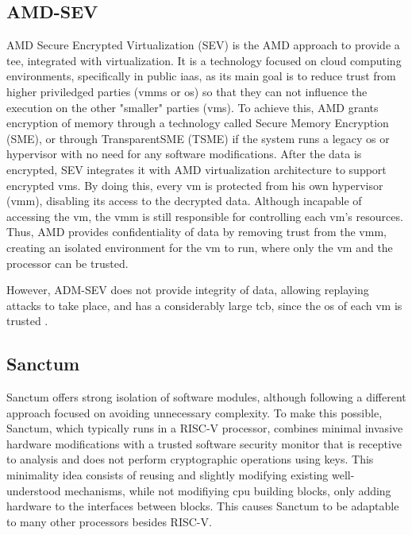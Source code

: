 \subsection{AMD-SEV}
\label{ssec:amdsev}
AMD Secure Encrypted Virtualization (SEV) \cite{amdPaper} is the AMD approach to provide a \gls{tee}, integrated with virtualization. It is a technology focused on cloud computing environments, specifically in public \gls{iaas}, as its main goal is to reduce trust from higher priviledged parties (\gls{vmm}s or \gls{os}) so that they can not influence the execution on the other "smaller" parties (\gls{vm}s). 
To achieve this, AMD grants encryption of memory through a technology called Secure Memory Encryption (SME), or through TransparentSME (TSME) if the system runs a legacy \gls{os} or hypervisor with no need for any software modifications.
After the data is encrypted, SEV integrates it with AMD virtualization architecture to support encrypted \gls{vm}s. By doing this, every \gls{vm} is protected from his own hypervisor (\gls{vmm}), disabling its access to the decrypted data. Although incapable of accessing the \gls{vm}, the \gls{vmm} is still responsible for controlling each \gls{vm}'s resources. 
Thus, AMD provides confidentiality of data by removing trust from the \gls{vmm}, creating an isolated environment for the \gls{vm} to run, where only the \gls{vm} and the processor can be trusted. 

However, ADM-SEV does not provide integrity of data, allowing replaying attacks to take place, and has a considerably large \gls{tcb}, since the \gls{os} of each \gls{vm} is trusted \cite{amdSEVPaper}. 

\subsection{Sanctum}
\label{ssec:sanctum}
Sanctum \cite{sanctumPaper} offers strong isolation of software modules, although following a different approach focused on avoiding unnecessary complexity.
To make this possible, Sanctum, which typically runs in a RISC-V processor, combines minimal invasive hardware modifications with a trusted software security monitor that is receptive to analysis and does not perform cryptographic operations using keys. 
This minimality idea consists of reusing and slightly modifying existing well-understood mechanisms, while not modifiying \gls{cpu} building blocks, only adding hardware to the interfaces between blocks. This causes Sanctum to be adaptable to many other processors besides RISC-V.

